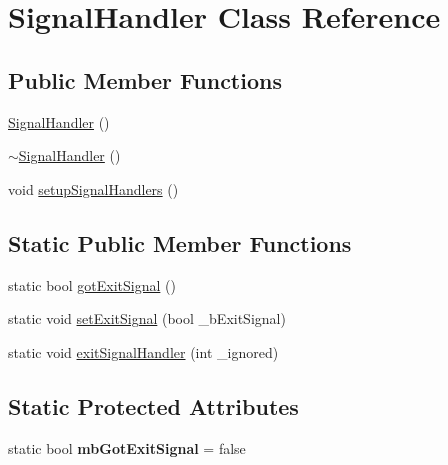 \hypertarget{class_signal_handler}{\section{Signal\-Handler Class Reference}
\label{class_signal_handler}
}
\subsection*{Public Member Functions}
\begin{DoxyCompactItemize}
\item 
\hyperlink{class_signal_handler_a3149ab1b5e1c8940d11b182f8059d916}{Signal\-Handler} ()
\item 
\hyperlink{class_signal_handler_addc8b5b0b969eb405376a77a369de007}{$\sim$\-Signal\-Handler} ()
\item 
void \hyperlink{class_signal_handler_a90eff6c9610cdcd77a1706491f2ce28a}{setup\-Signal\-Handlers} ()
\end{DoxyCompactItemize}
\subsection*{Static Public Member Functions}
\begin{DoxyCompactItemize}
\item 
static bool \hyperlink{class_signal_handler_a2183f0bfa67a2d4f48ac0728e87b4028}{got\-Exit\-Signal} ()
\item 
static void \hyperlink{class_signal_handler_a3957097139051b4d82bc50b83cf29080}{set\-Exit\-Signal} (bool \-\_\-b\-Exit\-Signal)
\item 
static void \hyperlink{class_signal_handler_a0481ef127cdf7fb80fd16a11f3c2b5a6}{exit\-Signal\-Handler} (int \-\_\-ignored)
\end{DoxyCompactItemize}
\subsection*{Static Protected Attributes}
\begin{DoxyCompactItemize}
\item 
\hypertarget{class_signal_handler_aaba4b32f36557a877c9081c8eeed4a98}{static bool {\bfseries mb\-Got\-Exit\-Signal} = false}\label{class_signal_handler_aaba4b32f36557a877c9081c8eeed4a98}

\end{DoxyCompactItemize}


